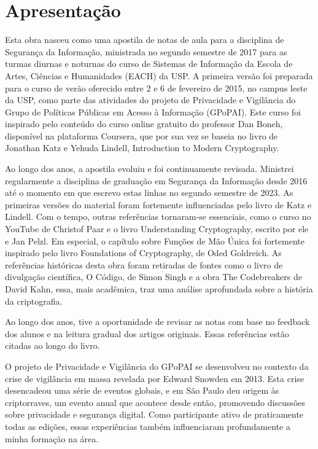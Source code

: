 ﻿\chapter*{Apresentação}

Esta obra nasceu como uma apostila de notas de aula para a disciplina de Segurança da Informação, ministrada no segundo semestre de 2017 para as turmas diurnas e noturnas do curso de Sistemas de Informação da Escola de Artes, Ciências e Humanidades (EACH) da USP.
A primeira versão foi preparada para o curso de verão oferecido entre 2 e 6 de fevereiro de 2015, no campus leste da USP, como parte das atividades do projeto de Privacidade e Vigilância do Grupo de Políticas Públicas em Acesso à Informação (GPoPAI).
Este curso foi inspirado pelo conteúdo do curso online gratuito do professor Dan Boneh, disponível na plataforma Coursera, que por sua vez se baseia no livro de Jonathan Katz e Yehuda Lindell, Introduction to Modern Cryptography.

Ao longo dos anos, a apostila evoluiu e foi continuamente revisada.
Ministrei regularmente a disciplina de graduação em Segurança da Informação desde 2016 até o momento em que escrevo estas linhas no segundo semestre de 2023.
As primeiras versões do material foram fortemente influenciadas pelo livro de Katz e Lindell.
Com o tempo, outras referências tornaram-se essenciais, como o curso no YouTube de Christof Paar e o livro Understanding Cryptography, escrito por ele e Jan Pelzl.
Em especial, o capítulo sobre Funções de Mão Única foi fortemente inspirado pelo livro Foundations of Cryptography, de Oded Goldreich.
As referências históricas desta obra foram retiradas de fontes como o livro de divulgação científica, O Código, de Simon Singh e a obra The Codebreakers de David Kahn, essa, mais acadêmica, traz uma análise aprofundada sobre a história da criptografia.

Ao longo dos anos, tive a oportunidade de revisar as notas com base no feedback dos alunos e na leitura gradual dos artigos originais.
Essas referências estão citadas ao longo do livro.

O projeto de Privacidade e Vigilância do GPoPAI se desenvolveu no contexto da crise de vigilância em massa revelada por Edward Snowden em 2013.
Esta crise desencadeou uma série de eventos globais, e em São Paulo deu origem às criptorraves, um evento anual que acontece desde então, promovendo discussões sobre privacidade e segurança digital.
Como participante ativo de praticamente todas as edições, essas experiências também influenciaram profundamente a minha formação na área.

